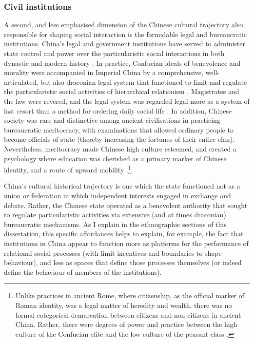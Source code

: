 \begin{CJK}{UTF8}{gbsn}
\subsubsection{Civil institutions}
A second, and less emphasised dimension of the Chinese cultural trajectory also responsible for shaping social interaction is the formidable legal and bureaucratic institutions.  China's legal and government institutions have served to administer state control and power over the particularistic social interactions in both dynastic and modern history \citep[]{Liu2017}.  In practice, Confucian ideals of benevolence and morality were accompanied in Imperial China by a comprehensive, well-articulated, but also draconian legal system that functioned to limit and regulate the particularistic social activities of hierarchical relationism \citep{Fitzgerald1985}.  Magistrates and the law were revered, and the legal system was regarded legal more as a system of last resort than a method for ordering daily social life \citep{Liu2009}.  In addition, Chinese society was rare and distinctive among ancient civilisations in practicing bureaucratic meritocracy, with examinations that allowed ordinary people to become officials of state (thereby increasing the fortunes of their entire clan).  Nevertheless, meritocracy made Chinese high culture esteemed, and created a psychology where education was cherished as a primary marker of Chinese identity, and a route of upward mobility \citep{Spence1990}.\footnote{Unlike practices in ancient Rome, where citizenship, as the official marker of Roman identity, was a legal matter of heredity and wealth, there was no formal categorical demarcation between citizens and non-citizens in ancient China.  Rather, there were degrees of power and practice between the high culture of the Confucian elite and the low culture of the peasant class \citep[see][]{Liu2014}.}.

China's cultural historical trajectory is one which the state functioned not as a union or federation in which independent interests engaged in exchange and debate.  Rather, the Chinese state operated as a benevolent authority that sought to regulate particularistic activities via extensive (and at times draconian) bureaucratic mechanisms.  As I explain in the ethnographic sections of this dissertation, this specific affordances helps to explain, for example, the fact that institutions in China appear to function more as platforms for the performance of relational social processes (with limit incentives and boundaries to shape behaviour), and less as spaces that define those processes themselves (or indeed define the behaviour of members of the institutions).


\end{CJK}
